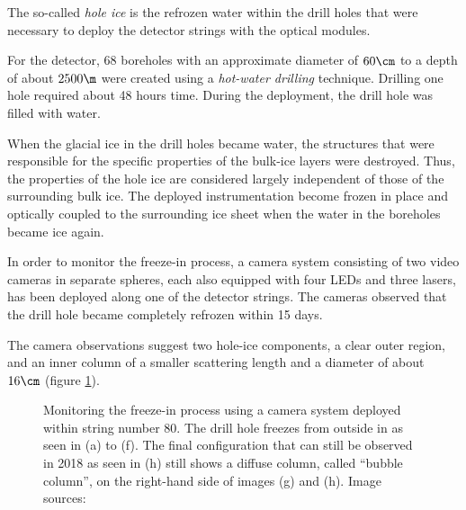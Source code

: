 The so-called \textit{hole ice} is the refrozen water within the drill holes that were necessary to deploy the detector strings with the optical modules.

For the \icecube detector, 68 boreholes with an approximate diameter of $60\cm$ to a depth of about $2500\m$ were created using a \textit{hot-water drilling} technique. Drilling one hole required about 48 hours time. During the deployment, the drill hole was filled with water. \cite{instrumentation}

When the glacial ice in the drill holes became water, the structures that were responsible for the specific properties of the bulk-ice layers were destroyed. Thus, the properties of the hole ice are considered largely independent of those of the surrounding bulk ice. The deployed instrumentation become frozen in place and optically coupled to the surrounding ice sheet when the water in the boreholes became ice again. \cite{instrumentation}

In order to monitor the freeze-in process, a camera system consisting of two video cameras in separate spheres, each also equipped with four LEDs and three lasers, has been deployed along one of the detector strings. The cameras observed that the drill hole became completely refrozen within 15 days. \cite{instrumentation}

The camera observations suggest two hole-ice components, a clear outer region, and an inner column of a smaller scattering length and a diameter of about $16\cm$ (figure \ref{fig:daeM6yot}). \cite{rongenswedishcamera,instrumentation}

\begin{figure}[htbp]
  \centering
  \hfill
  \hfill
  \hfill
  \hfill
  \hfill
  \hfill
  \hfill
  \hfill
  \caption{Monitoring the freeze-in process using a camera system deployed within string number 80. The drill hole freezes from outside in as seen in (a) to (f). The final configuration that can still be observed in 2018 as seen in (h) still shows a diffuse column, called \enquote{bubble column}, on the right-hand side of images (g) and (h). Image sources: \cite{icrc17pocam, camera2010, camera2018}}
  \label{fig:daeM6yot}
\end{figure}


